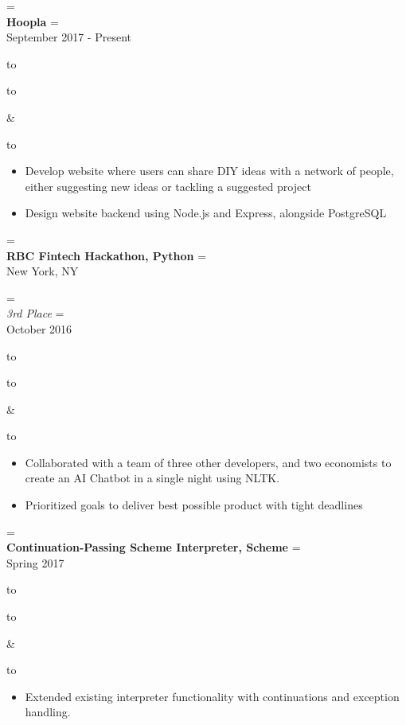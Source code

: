 \documentclass{article}
\newcommand{\appendtotoks}[2]{%
  #1=\expandafter{\the#1#2}%
}
\def\gobble#1{}
\def\gobblefirst#1{%
  #1\expandafter\expandafter\expandafter{\expandafter\gobble\the#1}}
\newcommand{\sectionTitle}[1]{{\Large #1} \vspace{4pt}}
\newenvironment{resumesection}[1]
  {\sectionTitle{#1}}
	{\vspace{10pt}}
\newcommand{\placeStyle}[1]{\textbf{#1}}
\newcommand{\positionStyle}[1]{\textit{#1}}
\newenvironment{newplace}
  {
    \newtoks\leftToks
    \newtoks\rightToks
    \newcommand{\placerow}[2]{%
      \appendtotoks{\leftToks}{\\\placeStyle{##1}}%
      \appendtotoks{\rightToks}{\\##2}}
    \newcommand{\jobrow}[2]{%
      \appendtotoks{\leftToks}{\\\positionStyle{##1}}%
      \appendtotoks{\rightToks}{\\##2}}
    \newcommand{\plainrow}[2]{%
      \appendtotoks{\leftToks}{\\##1}%
      \appendtotoks{\rightToks}{\\##2}}
    \setlength{\tabcolsep}{0pt}%
  }
  {%
    \begin{tabu} to \linewidth [h!]{X[65,l]X[35,r]}
      \begin{tabu} to \linewidth {X}
        \gobblefirst\leftToks
        \the\leftToks
      \end{tabu}
      &
      \begin{tabu} to \linewidth {X[r]}
        \gobblefirst\rightToks
        \the\rightToks
      \end{tabu}
    \end{tabu}%
  }
\newenvironment{bullets}
	{\begin{itemize}[noitemsep, topsep=0pt]}
	{\end{itemize}}
\begin{document}
\begin{resumesection}{Projects}


\begin{newplace}
  \placerow{Hoopla}{September 2017 - Present}
\end{newplace}

\begin{bullets}
  \item Develop website where users can share DIY ideas with a network
        of people, either suggesting new ideas or tackling a suggested
        project 
  \item Design website backend using Node.js and Express, alongside
        PostgreSQL 
\end{bullets}


\begin{newplace}
  \placerow{RBC Fintech Hackathon, Python}
					 {New York, NY}
	\jobrow  {3rd Place}
				   {October 2016}
\end{newplace}

\begin{bullets}
  \item Collaborated with a team of three other developers, and two
        economists to create an AI Chatbot in a single night using
        NLTK.
  \item Prioritized goals to deliver best possible product with tight
        deadlines
\end{bullets}


\begin{newplace}
  \placerow{Continuation-Passing Scheme Interpreter, Scheme}
           {Spring 2017}
\end{newplace}

\begin{bullets}
  \item Extended existing interpreter functionality with continuations
        and exception handling.
\end{bullets}


\end{resumesection}
\end{document}
